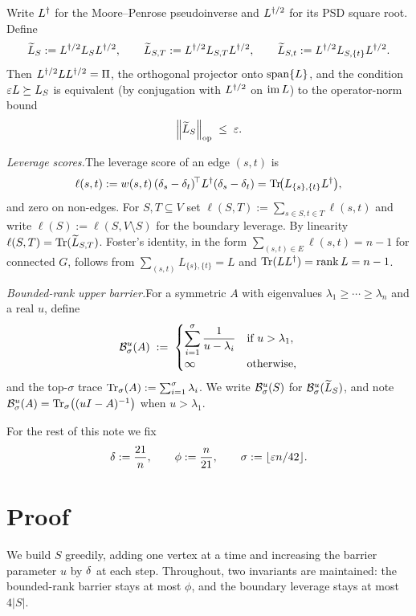 \documentclass[11pt]{article}
\begin{document}
Write $L^{\dagger}$ for the Moore--Penrose pseudoinverse and $L^{\dagger/2}$ for its PSD square
root. Define
\[
  \widetilde{L}_S      := L^{\dagger/2} L_S L^{\dagger/2}, \qquad
  \widetilde{L}_{S,T}  := L^{\dagger/2} L_{S,T}  L^{\dagger/2}, \qquad
  \widetilde{L}_{S,t}  := L^{\dagger/2} L_{S,\{t\}}L^{\dagger/2}.
\]
Then $L^{\dagger/2} L L^{\dagger/2} = \Pi$, the orthogonal projector onto $\operatorname{span}\{L\}$, and the
condition $\varepsilon L\succeq L_S$ is equivalent (by conjugation with $L^{\dagger/2}$ on
$\operatorname{im} L$) to the operator-norm bound
\begin{equation}\label{eq:opnorm-form}
  \left\lVert \widetilde{L}_S \right\rVert_{\mathrm{op}} \;\le\; \varepsilon.
\end{equation}

\medskip
\noindent\emph{Leverage scores.}\quad The leverage score of an edge $(s,t)$ is
\[
  \ell(s,t)
   := w(s,t)\,(\delta_s-\delta_t)^{\!\top}L^{\dagger}(\delta_s-\delta_t)
    = \operatorname{Tr}\!\bigl(L_{\{s\},\{t\}}L^{\dagger}\bigr),
\]
and zero on non-edges. For $S,T\subseteq V$ set
$\ell(S,T):=\sum_{s\in S,t\in T}\ell(s,t)$ and write
$\ell(S):=\ell(S,V\setminus S)$ for the boundary leverage. By linearity
$\ell(S,T)=\operatorname{Tr}(\widetilde{L}_{S,T})$. Foster's identity, in the form
$\sum_{(s,t)\in E}\ell(s,t)=n-1$ for connected $G$, follows from
$\sum_{(s,t)}L_{\{s\},\{t\}}=L$ and $\operatorname{Tr}(LL^{\dagger})=\operatorname{rank} L = n-1$.

\medskip
\noindent\emph{Bounded-rank upper barrier.}\quad For a symmetric $A$ with
eigenvalues $\lambda_1\ge\cdots\ge\lambda_n$ and a real $u$, define
\[
  \mathcal{B}^{u}_{\sigma}(A) \;:=\;
  \begin{cases}
    \displaystyle\sum_{i=1}^{\sigma}\dfrac{1}{u-\lambda_i} & \text{if } u>\lambda_1,\\[2pt]
    \infty & \text{otherwise,}
  \end{cases}
\]
and the top-$\sigma$ trace $\operatorname{Tr}_{\sigma}(A):=\sum_{i=1}^{\sigma}\lambda_i$. We write
$\mathcal{B}^{u}_{\sigma}(S)$ for $\mathcal{B}^{u}_{\sigma}(\widetilde{L}_S)$, and note
$\mathcal{B}^{u}_{\sigma}(A)=\operatorname{Tr}_{\sigma}\bigl((uI-A)^{-1}\bigr)$ when $u>\lambda_1$.

For the rest of this note we fix
\[
  \delta := \frac{21}{n}, \qquad
  \phi := \frac{n}{21}, \qquad
  \sigma := \lfloor \varepsilon n/42 \rfloor.
\]

\section*{Proof}

We build $S$ greedily, adding one vertex at a time and increasing the barrier
parameter $u$ by $\delta$ at each step. Throughout, two invariants are
maintained: the bounded-rank barrier stays at most $\phi$, and the boundary
leverage stays at most $4|S|$.
\end{document}
